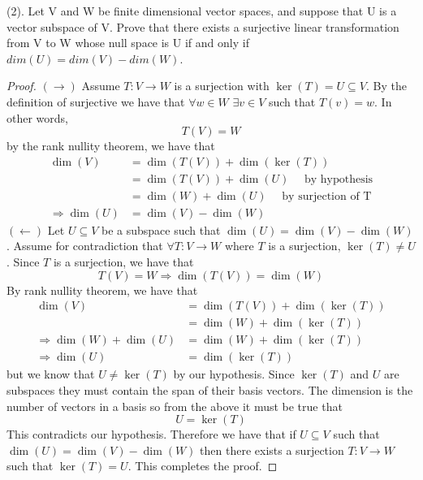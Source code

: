 \documentclass[a4paper, 11pt]{article}
\newenvironment{solution}{%
	\begin{list}{}{%
			\setlength{\topsep}{0pt}%
			\setlength{\leftmargin}{1.5cm}%
			\setlength{\rightmargin}{1.5cm}%
			\setlength{\listparindent}{\parindent}%
			\setlength{\itemindent}{\parindent}%
			\setlength{\parsep}{\parskip}%
		}%
		\item[]}{\end{list}}
\begin{document}
\noindent(2). Let V and W be finite dimensional vector spaces, and suppose that U is a vector subspace of V. Prove that there exists a surjective linear transformation from V to W whose null space is U if and only if $dim(U) = dim(V) - dim(W)$. \\
	\begin{solution}
		\begin{proof}
			$(\rightarrow)$ Assume $T:V\to W$ is a surjection with $\ker(T)=U\subseteq V$. By the definition of surjective we have that $\forall w\in W$ $\exists v \in V$ such that $T(v) = w$. In other words, 
				\begin{equation*}
					T(V) = W 
				\end{equation*}
			by the rank nullity theorem, we have that 
				\begin{align*}
					\dim(V) &= \dim(T(V)) + \dim(\ker(T)) \\ 
						&= \dim(T(V)) + \dim(U) \quad \text{ by hypothesis} \\ 
						&= \dim(W) + \dim(U) \quad \text{ by surjection of T} \\ 
					\Rightarrow \dim(U) &= \dim(V) - \dim(W) 
				\end{align*}
			$(\leftarrow)$ Let $U\subseteq V$ be a subspace such that $\dim(U)=\dim(V)-\dim(W)$. Assume for contradiction that $\forall T:V\to W$ where $T$ is a surjection, $\ker(T)\neq U$. Since $T$ is a surjection, we have that
				\begin{equation*}
					T(V) = W \Rightarrow \dim(T(V)) = \dim(W) 
				\end{equation*}
			By rank nullity theorem, we have that
				\begin{align*}
					\dim(V) &= \dim(T(V)) + \dim(\ker(T)) \\ 
						&= \dim(W) + \dim(\ker(T))  \\
					\Rightarrow \dim(W)+\dim(U) &= \dim(W) + \dim(\ker(T)) \\
					\Rightarrow \dim(U) &= \dim(\ker(T)) 
				\end{align*}
			but we know that $U\neq \ker(T)$ by our hypothesis. Since $\ker(T)$ and $U$ are subspaces they must contain the span of their basis vectors. The dimension is the number of vectors in a basis so from the above it must be true that 
				\begin{equation*}
					U   = \ker(T)  
				\end{equation*}
			This contradicts our hypothesis. Therefore we have that if $U\subseteq V$ such that $\dim(U) = \dim(V)-\dim(W)$ then there exists a surjection $T:V\to W$ such that $\ker(T) = U$. This completes the proof. 
		\end{proof}
	\end{solution}
\end{document}
